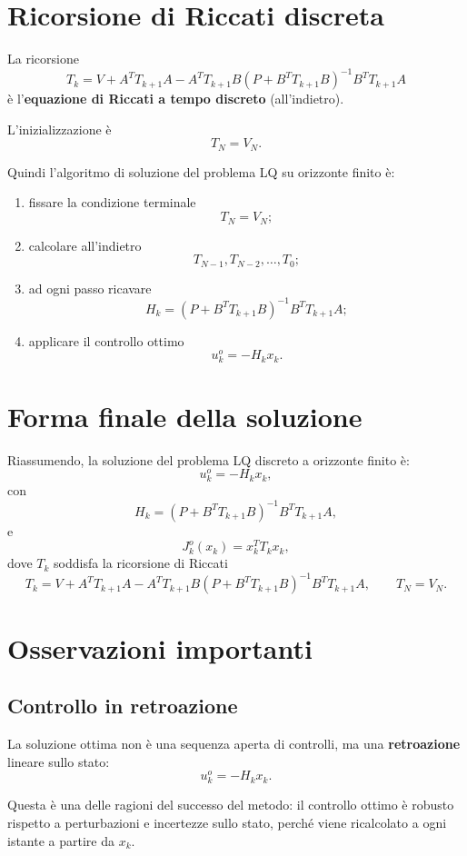 \section{Ricorsione di Riccati discreta}

La ricorsione
\[
T_k
=
V
+
A^TT_{k+1}A
-
A^TT_{k+1}B
(P+B^TT_{k+1}B)^{-1}
B^TT_{k+1}A
\]
è l'\textbf{equazione di Riccati a tempo discreto} (all'indietro).

L'inizializzazione è
\[
T_N=V_N.
\]

Quindi l'algoritmo di soluzione del problema LQ su orizzonte finito è:

\begin{enumerate}
    \item fissare la condizione terminale
    \[
    T_N=V_N;
    \]
    \item calcolare all'indietro
    \[
    T_{N-1},T_{N-2},\dots,T_0;
    \]
    \item ad ogni passo ricavare
    \[
    H_k=(P+B^TT_{k+1}B)^{-1}B^TT_{k+1}A;
    \]
    \item applicare il controllo ottimo
    \[
    u_k^o=-H_kx_k.
    \]
\end{enumerate}

\section{Forma finale della soluzione}

Riassumendo, la soluzione del problema LQ discreto a orizzonte finito è:
\[
u_k^o=-H_kx_k,
\]
con
\[
H_k=(P+B^TT_{k+1}B)^{-1}B^TT_{k+1}A,
\]
e
\[
J_k^o(x_k)=x_k^TT_kx_k,
\]
dove \(T_k\) soddisfa la ricorsione di Riccati
\[
T_k
=
V
+
A^TT_{k+1}A
-
A^TT_{k+1}B
(P+B^TT_{k+1}B)^{-1}
B^TT_{k+1}A,
\qquad
T_N=V_N.
\]

\section{Osservazioni importanti}

\subsection{Controllo in retroazione}

La soluzione ottima non è una sequenza aperta di controlli, ma una \textbf{retroazione}
lineare sullo stato:
\[
u_k^o=-H_kx_k.
\]

Questa è una delle ragioni del successo del metodo:
il controllo ottimo è robusto rispetto a perturbazioni e incertezze sullo stato,
perché viene ricalcolato a ogni istante a partire da \(x_k\).

